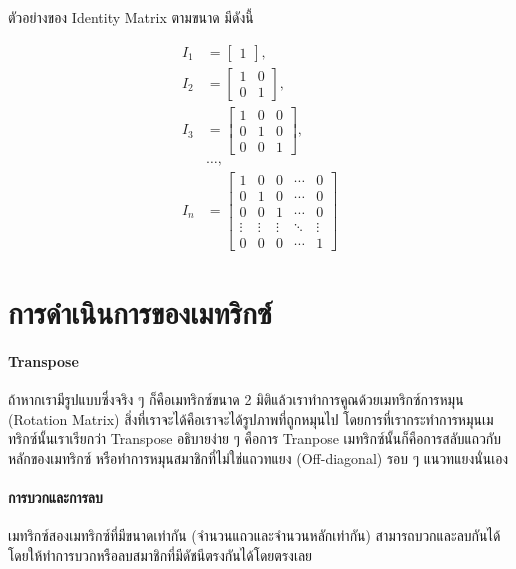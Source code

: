 \noindent ตัวอย่างของ Identity Matrix ตามขนาด มีดังนี้

\begin{align}
    I_1 &= \begin{bmatrix} 1 \end{bmatrix}
    ,\ \\
    I_2 &= \begin{bmatrix}
    1 & 0 \\
    0 & 1 \end{bmatrix}
    ,\ \\
    I_3 &= \begin{bmatrix}
    1 & 0 & 0 \\
    0 & 1 & 0 \\
    0 & 0 & 1 \end{bmatrix}
    ,\ \\ 
    & \dots ,\ \\
    I_n &= \begin{bmatrix}
    1 & 0 & 0 & \cdots & 0 \\
    0 & 1 & 0 & \cdots & 0 \\
    0 & 0 & 1 & \cdots & 0 \\
    \vdots & \vdots & \vdots & \ddots & \vdots \\
    0 & 0 & 0 & \cdots & 1 \end{bmatrix}
\end{align}

\section{การดำเนินการของเมทริกซ์}
\label{sec:matrix_operate}

\paragraph{Transpose} ถ้าหากเรามีรูปแบบซึ่งจริง ๆ ก็คือเมทริกซ์ขนาด 2 มิติแล้วเราทำการคูณด้วยเมทริกซ์การหมุน (Rotation Matrix) 
สิ่งที่เราจะได้คือเราจะได้รูปภาพที่ถูกหมุนไป โดยการที่เรากระทำการหมุนเมทริกซ์นั้นเราเรียกว่า Transpose 
อธิบายง่าย ๆ คือการ Tranpose เมทริกซ์นั้นก็คือการสลับแถวกับหลักของเมทริกซ์ หรือทำการหมุนสมาชิกที่ไม่ใช่แถวทแยง (Off-diagonal) 
รอบ ๆ แนวทแยงนั่นเอง

\paragraph{การบวกและการลบ} เมทริกซ์สองเมทริกซ์ที่มีขนาดเท่ากัน (จำนวนแถวและจำนวนหลักเท่ากัน) สามารถบวกและลบกันได้ 
โดยให้ทำการบวกหรือลบสมาชิกที่มีดัชนีตรงกันได้โดยตรงเลย

